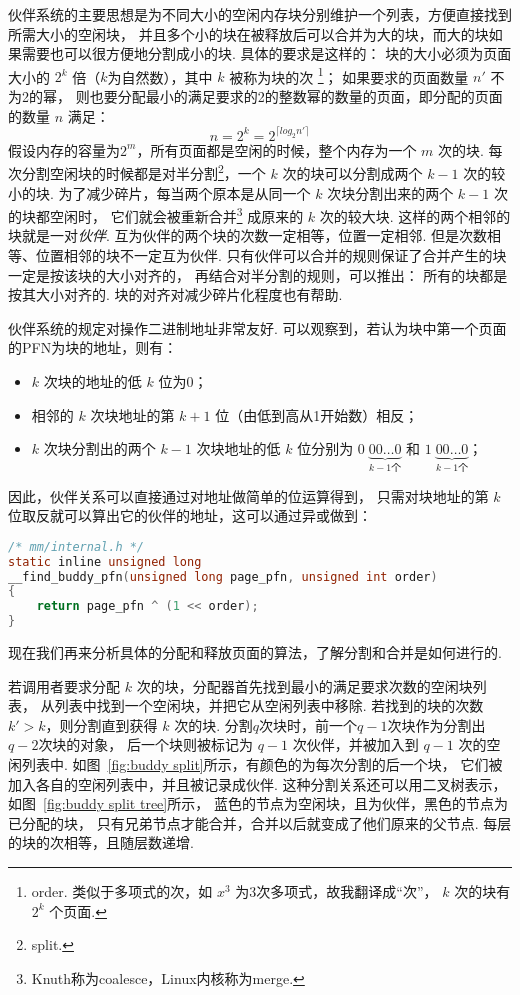 伙伴系统的主要思想是为不同大小的空闲内存块分别维护一个列表，方便直接找到所需大小的空闲块，
并且多个小的块在被释放后可以合并为大的块，而大的块如果需要也可以很方便地分割成小的块.
具体的要求是这样的：
块的大小必须为页面大小的 $2^k$ 倍（$k$为自然数），其中 $k$ 被称为块的次%
\footnote{order. 类似于多项式的次，如 $x^3$ 为3次多项式，故我翻译成“次”，
	$k$ 次的块有 $2^k$ 个页面.}；
如果要求的页面数量 $n'$ 不为2的幂，
则也要分配最小的满足要求的2的整数幂的数量的页面，即分配的页面的数量 $n$ 满足：
\begin{equation*}
	n = 2^k = 2^{\lceil log_{2}{n'}\rceil}
\end{equation*}
假设内存的容量为$2^m$，所有页面都是空闲的时候，整个内存为一个 $m$ 次的块.
每次分割空闲块的时候都是对半分割\footnote{split.}，一个 $k$ 次的块可以分割成两个 $k-1$ 次的较小的块.
为了减少碎片，每当两个原本是从同一个 $k$ 次块分割出来的两个 $k-1$ 次的块都空闲时，
它们就会被重新合并\footnote{Knuth称为coalesce，Linux内核称为merge.}%
成原来的 $k$ 次的较大块.
这样的两个相邻的块就是一对\emph{伙伴}.
互为伙伴的两个块的次数一定相等，位置一定相邻.
但是次数相等、位置相邻的块不一定互为伙伴.
只有伙伴可以合并的规则保证了合并产生的块一定是按该块的大小对齐的，
再结合对半分割的规则，可以推出：
所有的块都是按其大小对齐的.
块的对齐对减少碎片化程度也有帮助.

伙伴系统的规定对操作二进制地址非常友好.\cite{taocp1}
可以观察到，若认为块中第一个页面的PFN为块的地址，则有：
\begin{itemize}
	\item $k$ 次块的地址的低 $k$ 位为0；
	\item 相邻的 $k$ 次块地址的第 $k+1$ 位（由低到高从1开始数）相反；
	\item $k$ 次块分割出的两个 $k-1$ 次块地址的低 $k$ 位分别为
	      $0\;{\underbrace{00\dots 0}_{k-1\text{个}}}$ 和
	      $1\;{\underbrace{00\dots 0}_{k-1\text{个}}}$；
\end{itemize}
因此，伙伴关系可以直接通过对地址做简单的位运算得到，
只需对块地址的第 $k$ 位取反就可以算出它的伙伴的地址，这可以通过异或做到：
\begin{lstlisting}[language=C, caption={计算伙伴的PFN}]
/* mm/internal.h */
static inline unsigned long
__find_buddy_pfn(unsigned long page_pfn, unsigned int order)
{
	return page_pfn ^ (1 << order);
}
\end{lstlisting}

现在我们再来分析具体的分配和释放页面的算法，了解分割和合并是如何进行的.

若调用者要求分配 $k$ 次的块，分配器首先找到最小的满足要求次数的空闲块列表，
从列表中找到一个空闲块，并把它从空闲列表中移除.
若找到的块的次数 $k' > k$，则分割直到获得 $k$ 次的块.
分割$q$次块时，前一个$q-1$次块作为分割出$q-2$次块的对象，
后一个块则被标记为 $q-1$ 次伙伴，并被加入到 $q-1$ 次的空闲列表中.
如图~\ref{fig:buddy split}所示，有颜色的为每次分割的后一个块，
它们被加入各自的空闲列表中，并且被记录成伙伴.
这种分割关系还可以用二叉树表示，如图~\ref{fig:buddy split tree}所示，
蓝色的节点为空闲块，且为伙伴，黑色的节点为已分配的块，
只有兄弟节点才能合并，合并以后就变成了他们原来的父节点.
每层的块的次相等，且随层数递增.

